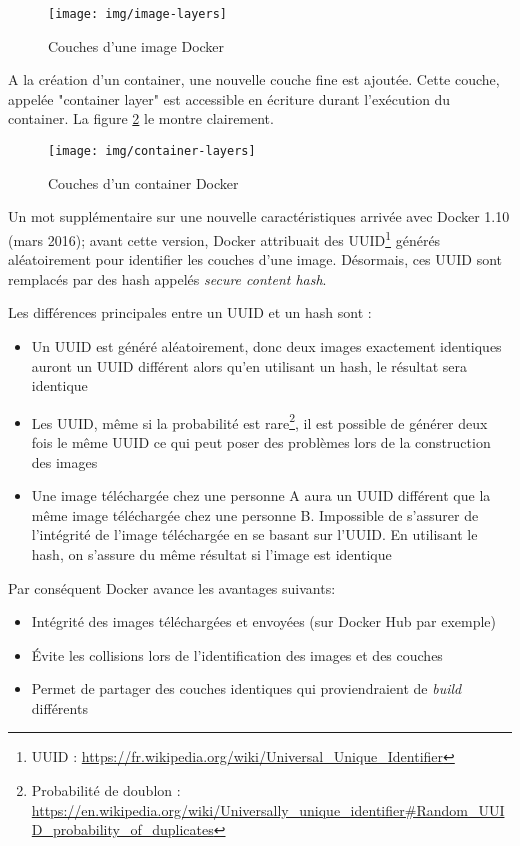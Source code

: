 \begin{figure}[hbtp]
\centering
\texttt{[image: img/image-layers]}
\caption{Couches d'une image Docker}
\label{docker-image-layers}
\end{figure}

A la création d'un container, une nouvelle couche fine est ajoutée. Cette couche, appelée "container layer" est accessible en écriture durant l'exécution du container. La figure \ref{docker-container-layers} le montre clairement.

\begin{figure}[hbtp]
\centering
\texttt{[image: img/container-layers]}
\caption{Couches d'un container Docker}
\label{docker-container-layers}
\end{figure}

Un mot supplémentaire sur une nouvelle caractéristiques arrivée avec Docker 1.10 (mars 2016); avant cette version, Docker attribuait des UUID\footnote{UUID : \url{https://fr.wikipedia.org/wiki/Universal_Unique_Identifier}} générés aléatoirement pour identifier les couches d'une image. Désormais, ces UUID sont remplacés par des hash appelés \textit{secure content hash}.

Les différences principales entre un UUID et un hash sont :
\begin{itemize}
\item Un UUID est généré aléatoirement, donc deux images exactement identiques auront un UUID différent alors qu'en utilisant un hash, le résultat sera identique
\item Les UUID, même si la probabilité est rare\footnote{Probabilité de doublon : \url{https://en.wikipedia.org/wiki/Universally_unique_identifier\#Random_UUID_probability_of_duplicates}}, il est possible de générer deux fois le même UUID ce qui peut poser des problèmes lors de la construction des images
\item Une image téléchargée chez une personne A aura un UUID différent que la même image téléchargée chez une personne B. Impossible de s'assurer de l'intégrité de l'image téléchargée en se basant sur l'UUID. En utilisant le hash, on s'assure du même résultat si l'image est identique
\end{itemize}

Par conséquent Docker avance les avantages suivants:
\begin{itemize}
\item Intégrité des images téléchargées et envoyées (sur Docker Hub par exemple)
\item Évite les collisions lors de l'identification des images et des couches
\item Permet de partager des couches identiques qui proviendraient de \textit{build} différents
\end{itemize}

